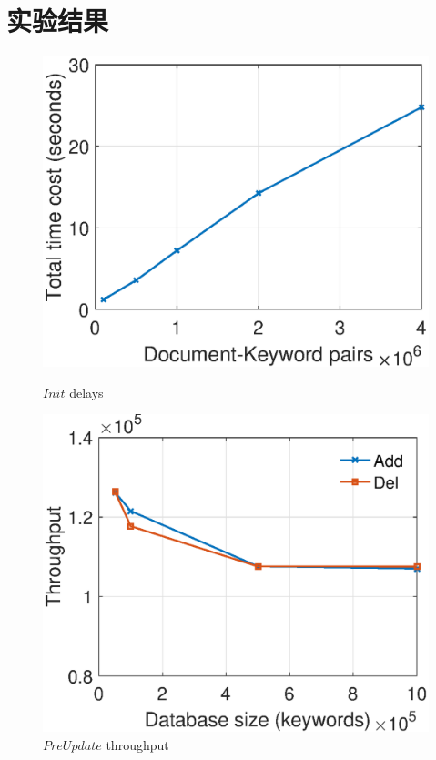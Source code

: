 \section{实验结果}

\begin{figure}[bhpt]
\centering
  \begin{minipage}[b]{0.48 \textwidth}
    \includegraphics[width=\textwidth]{expr/initialization}
    \caption{$Init$ delays}
    \label{fig:init}
  \end{minipage}
  \begin{minipage}[b]{0.48 \textwidth}
    \includegraphics[width=\textwidth]{expr/update}
    \caption{$PreUpdate$ throughput}
    \label{fig:update}
  \end{minipage}


\end{figure}
